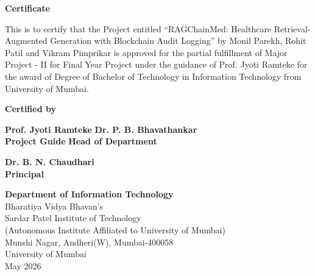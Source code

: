 \documentclass[12pt,singleside,a4paper]{article}
\begin{document}
\thispagestyle{empty}
\vspace*{0.2cm}
\vspace{1cm}
\begin{center}
\large\textbf{Certificate}
\end{center}
\vspace{1cm}
This is to certify that the Project entitled ``RAGChainMed: Healthcare Retrieval-Augmented Generation with Blockchain Audit Logging'' by Monil Parekh, Rohit Patil and Vikram Pimprikar is approved for the partial fulfillment of Major Project - II for Final Year Project under the guidance of Prof. Jyoti Ramteke for the award of Degree of Bachelor of Technology in Information Technology from University of Mumbai.\\
\vspace{1cm}
\begin{center}
\textbf{Certified by}
\end{center}
\vspace{1cm}

\textbf{Prof. Jyoti Ramteke} \hspace{2.5in} \textbf{Dr. P. B. Bhavathankar}\\ \hspace*{0.5cm}
\textbf{Project Guide} \hspace{3.3in} \textbf{Head of Department} \\
\vspace{1cm}
 
\begin{center}
\textbf{Dr. B. N. Chaudhari}\\
\textbf{Principal}
\end{center}

\begin{center}
\textbf{Department of Information Technology}\\
Bharatiya Vidya Bhavan's\\
Sardar Patel Institute of Technology\\
(Autonomous Institute Affiliated to University of Mumbai)\\
Munshi Nagar, Andheri(W), Mumbai-400058\\
University of Mumbai\\
May 2026\\
\end{center}

\pagebreak
\end{document}
